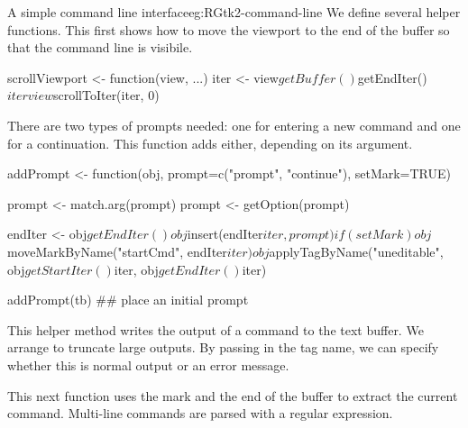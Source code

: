 \begin{example}{A simple command line interface}{eg:RGtk2-command-line}
We define several helper functions. This first shows how to move the
viewport to the end of the buffer so that the command line is visibile.
\begin{Schunk}
\begin{Sinput}
 scrollViewport <- function(view, ...) {
   iter <- view$getBuffer()$getEndIter()$iter
   view$scrollToIter(iter, 0)
 }
\end{Sinput}
\end{Schunk}

There are two types of prompts needed: one for entering a new command
and one for a continuation. This function adds either, depending on
its argument.
\begin{Schunk}
\begin{Sinput}
 addPrompt <- function(obj, prompt=c("prompt", "continue"),
                       setMark=TRUE) 
 {
   prompt <- match.arg(prompt)
   prompt <- getOption(prompt)
   
   endIter <- obj$getEndIter()
   obj$insert(endIter$iter, prompt)
   if(setMark)
     obj$moveMarkByName("startCmd", endIter$iter)
   obj$applyTagByName("uneditable", obj$getStartIter()$iter, 
                      obj$getEndIter()$iter)
 }
 addPrompt(tb) ## place an initial prompt
\end{Sinput}
\end{Schunk}

This helper method writes the output of a command to the text
buffer. We arrange to truncate large outputs. By passing in the tag
name, we can specify whether this is normal output or an error
message.
\begin{Schunk}
\end{Schunk}

This next function uses the  mark and the end of the buffer
to extract the current command. Multi-line commands are parsed with a
regular expression.
\begin{Schunk}
\end{Schunk}


\end{example}
